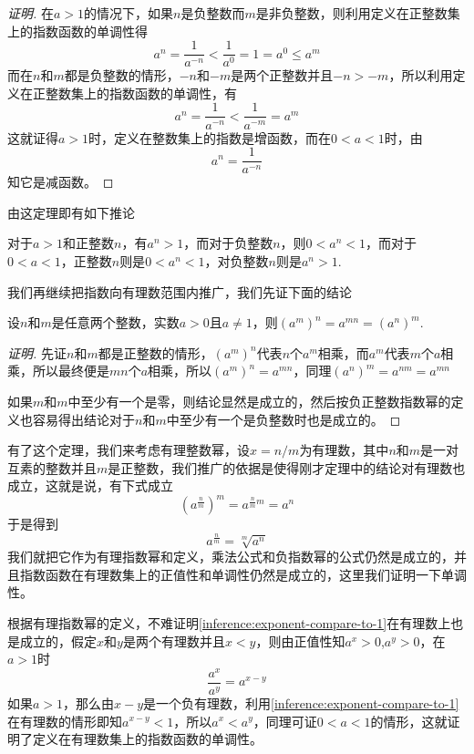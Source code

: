 \begin{proof}[证明]
  在$a>1$的情况下，如果$n$是负整数而$m$是非负整数，则利用定义在正整数集上的指数函数的单调性得
  \[ a^n = \frac{1}{a^{-n}} < \frac{1}{a^0} = 1 = a^0 \leqslant a^m \]
  而在$n$和$m$都是负整数的情形，$-n$和$-m$是两个正整数并且$-n>-m$，所以利用定义在正整数集上的指数函数的单调性，有
  \[ a^n = \frac{1}{a^{-n}} < \frac{1}{a^{-m}} = a^m \]
  这就证得$a>1$时，定义在整数集上的指数是增函数，而在$0<a<1$时，由
  \[ a^n = \frac{1}{a^{-n}} \]
  知它是减函数。
\end{proof}

由这定理即有如下推论
\begin{inference}
  \label{inference:exponent-compare-to-1}
对于$a>1$和正整数$n$，有$a^n>1$，而对于负整数$n$，则$0<a^n<1$，而对于$0<a<1$，正整数$n$则是$0<a^n<1$，对负整数$n$则是$a^n>1$.
\end{inference}


我们再继续把指数向有理数范围内推广，我们先证下面的结论
\begin{theorem}
 设$n$和$m$是任意两个整数，实数$a>0$且$a \neq 1$，则$(a^m)^n = a^{mn} = (a^n)^m$. 
\end{theorem}

\begin{proof}[证明]
  先证$n$和$m$都是正整数的情形，$(a^m)^n$代表$n$个$a^m$相乘，而$a^m$代表$m$个$a$相乘，所以最终便是$mn$个$a$相乘，所以$(a^m)^n=a^{mn}$，同理$(a^n)^m=a^{nm}=a^{mn}$

  如果$m$和$m$中至少有一个是零，则结论显然是成立的，然后按负正整数指数幂的定义也容易得出结论对于$n$和$m$中至少有一个是负整数时也是成立的。
\end{proof}

有了这个定理，我们来考虑有理整数幂，设$x=n/m$为有理数，其中$n$和$m$是一对互素的整数并且$m$是正整数，我们推广的依据是使得刚才定理中的结论对有理数也成立，这就是说，有下式成立
\[ (a^{\frac{n}{m}})^m = a^{\frac{n}{m}m} = a^n \]
于是得到
\[ a^{\frac{n}{m}} = \sqrt[m]{a^n} \]
我们就把它作为有理指数幂和定义，乘法公式和负指数幂的公式仍然是成立的，并且指数函数在有理数集上的正值性和单调性仍然是成立的，这里我们证明一下单调性。

根据有理指数幂的定义，不难证明\autoref{inference:exponent-compare-to-1}在有理数上也是成立的，假定$x$和$y$是两个有理数并且$x<y$，则由正值性知$a^x>0$,$a^y>0$，在$a>1$时
\[ \frac{a^x}{a^y} = a^{x-y} \]
如果$a>1$，那么由$x-y$是一个负有理数，利用\autoref{inference:exponent-compare-to-1} 在有理数的情形即知$a^{x-y}<1$，所以$a^x<a^y$，同理可证$0<a<1$的情形，这就证明了定义在有理数集上的指数函数的单调性。

